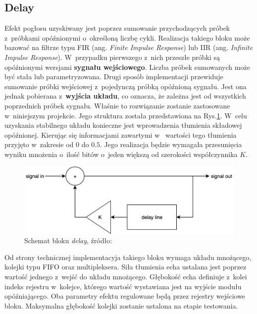 \subsection{Delay}

Efekt pogłosu uzyskiwany jest poprzez sumowanie przychodzących próbek z~próbkami opóźnionymi o~określoną liczbę cykli. Realizacja takiego bloku może bazować na filtrze typu FIR (ang. \textit{Finite Impulse Response}) lub IIR (ang. \textit{Infinite Impulse Response}). W~przypadku pierwszego z~nich przeszłe próbki są opóźnionymi wersjami \textbf{sygnału wejściowego}. Liczba próbek sumowanych może być stała lub parametryzowana. Drugi sposób implementacji przewiduje sumowanie próbki wejściowej z~pojedynczą próbką opóźnioną sygnału. Jest ona jednak pobierana z~\textbf{wyjścia układu}, co oznacza, że zależna jest od wszystkich poprzednich próbek sygnału. Właśnie to rozwiązanie zostanie zastosowane w~niniejszym projekcie. Jego struktura została przedstawiona na Rys.\ref{effects-delay}. W~celu uzyskania stabilnego układu konieczne jest wprowadzenia tłumienia składowej opóźnionej. Kierując się informacjami zawartymi w~\cite{fpga_pedal} wartości tego tłumienia przyjęto w~zakresie od $0$ do $0.5$. Jego realizacja będzie wymagała przesunięcia wyniku mnożenia o~ilość bitów o~jeden większą od szerokości współczynnika $K$.

\vspace{0.5cm}
\begin{figure}[ht]
    \centering
    \includegraphics[scale=0.4]{img/theoretical-analysis/delay.jpg}
    \captionsetup{format=plain,justification=centering}
    \caption{Schemat bloku \textit{delay}, źródło: \cite{fpga_pedal}}
    \label{effects-delay}
\end{figure}
\vspace{0.5cm}

Od strony technicznej implementacyja takiego bloku wymaga układu mnożącego, kolejki typu FIFO oraz multipleksera. Siła tłumienia echa ustalana jest poprzez wartość jednego z~wejść do układu mnożącego. Głębokość echa definiuje z~kolei indeks rejestru w~kolejce, którego wartość wystawiana jest na wyjście modułu opóźniającego. Oba parametry efektu regulowane będą przez rejestry wejściowe bloku. Maksymalna głębokość kolejki zostanie ustalona na etapie testowania.

